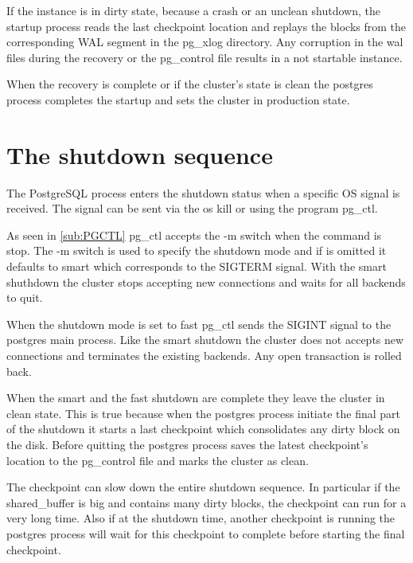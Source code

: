 If  the instance is in dirty state, because a crash or an unclean shutdown, the startup
process reads the last checkpoint location and replays the blocks from the corresponding WAL
segment in the pg\_xlog directory. Any corruption in the wal files during the recovery or the
pg\_control file results in a not startable instance.\newline

When the recovery is complete or if the cluster's state is clean the postgres process completes the
startup and sets the cluster in production state. 


\section{The shutdown sequence} 
\label{sec:SHUTDOWN_SEQ}

The PostgreSQL process enters the shutdown status when a specific OS signal is received. The signal
can be sent via the os kill or using the program pg\_ctl. \newline

As seen in \ref{sub:PGCTL} pg\_ctl accepts the -m switch when the command is stop. The -m switch
is used to specify the shutdown mode and if is omitted it defaults to smart which corresponds to
the SIGTERM signal. With the smart shuthdown the cluster stops accepting new connections and
waits for all backends to quit. \newline

When the shutdown mode is set to fast pg\_ctl sends the SIGINT signal to the postgres main process.
Like the smart shutdown the cluster does not accepts new connections and terminates the existing
backends. Any open transaction is rolled back. \newline

When the smart and the fast shutdown are complete they leave the cluster in clean state. This is
true because when the postgres process initiate the final part of the shutdown it starts a
last checkpoint which consolidates any dirty block on the disk. Before quitting the postgres
process saves the latest checkpoint's location to the pg\_control file and marks the
cluster as clean.\newline

The checkpoint can slow down the entire shutdown sequence. In particular if the shared\_buffer is
big and contains many dirty blocks, the checkpoint can run for a very long time. Also if at
the shutdown time, another checkpoint is running the postgres process will wait for this
checkpoint to complete before starting the final checkpoint.\newline

